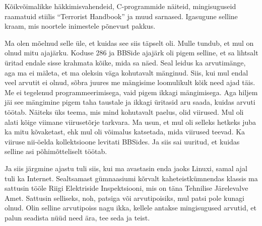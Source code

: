
Kõikvõimalikke häkkimisvahendeid, C-programmide näiteid, mingisuguseid raamatuid 
stiilis \enquote{Terrorist Handbook} ja muud sarnased. Igasugune 
selline kraam, mis  noortele inimestele põnevust pakkus.


Ma olen mõelnud selle üle, et kuidas see siis täpselt oli. Mulle tundub, et mul 
on olnud  mitu  ajajärku. Koduse 286 ja BBSide ajajärk oli pigem selline, et sa 
lihtsalt üritad endale sisse krahmata kõike, mida sa näed. Seal leidus ka 
arvutimänge, aga ma ei mäleta, et ma oleksin väga  kohutavalt mänginud. Siis, 
kui mul endal veel arvutit ei olnud,  sõbra juures me mängisime loomulikult 
kõik need ajad täis. Me ei tegelenud programmeerimisega, vaid pigem ikkagi 
mängimisega. Aga hiljem jäi see mängimine pigem taha taustale ja ikkagi 
üritasid aru saada, kuidas arvuti töötab. Näiteks üks teema, mis mind 
kohutavalt paelus, olid viirused. Mul oli alati kõige viimane viirusetõrje 
tarkvara. Ma usun, et mul oli selleks hetkeks juba ka mitu kõvaketast, ehk mul 
oli võimalus katsetada, mida viirused teevad. Ka  viiruse nii-öelda 
kollektsioone levitati BBSides. Ja siis sai uuritud, et kuidas selline asi 
põhimõtteliselt töötab. 

Ja siis järgmine ajastu tuli siis, kui ma avastasin enda jaoks 
Linuxi, samal ajal tuli ka Internet. Sealtsamast gümnaasiumi 
kõrvalt kaheteistkümnendas klassis ma sattusin tööle Riigi Elektriside 
Inspektsiooni, mis on täna Tehnilise Järelevalve Amet. Sattusin selliseks, noh,  patsiga või arvutipoisiks, mul patsi pole 
kunagi olnud. Olin selline arvutipoiss nagu ikka, kellele antakse mingisugused 
arvutid, et palun seadista nüüd need ära, tee seda ja teist.

